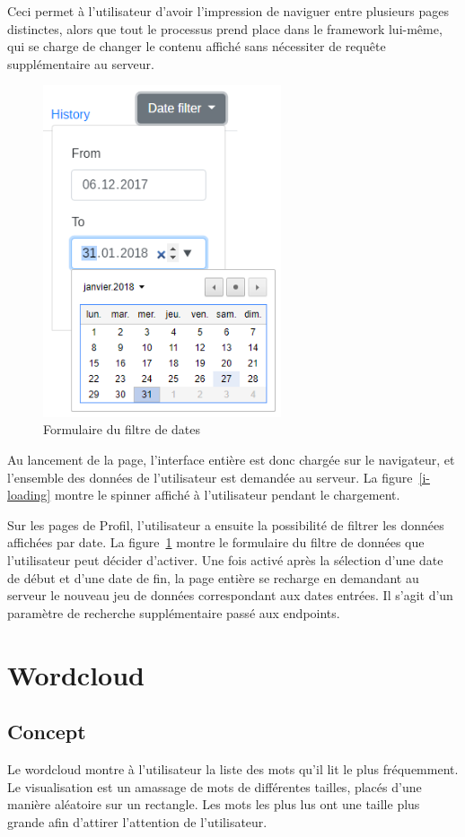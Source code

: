		Ceci permet à l'utilisateur d'avoir l'impression de naviguer entre plusieurs pages distinctes, alors que tout le processus prend place dans le framework lui-même, qui se charge de changer le contenu affiché sans nécessiter de requête supplémentaire au serveur.

		\begin{figure}[!h]
			\centering
			\includegraphics[width=7cm]{images/design/date_filter}
			\caption{Formulaire du filtre de dates}\label{i-filter}
		\end{figure}

		Au lancement de la page, l'interface entière est donc chargée sur le navigateur, et l'ensemble des données de l'utilisateur est demandée au serveur. La figure~\ref{i-loading} montre le spinner affiché à l'utilisateur pendant le chargement.

		Sur les pages de Profil, l'utilisateur a ensuite la possibilité de filtrer les données affichées par date. La figure~\ref{i-filter} montre le formulaire du filtre de données que l'utilisateur peut décider d'activer. Une fois activé après la sélection d'une date de début et d'une date de fin, la page entière se recharge en demandant au serveur le nouveau jeu de données correspondant aux dates entrées. Il s'agit d'un paramètre de recherche supplémentaire passé aux endpoints.

%
%
%
%

\section{Wordcloud}

	\subsection{Concept}
		Le wordcloud montre à l'utilisateur la liste des mots qu'il lit le plus fréquemment. Le visualisation est un amassage de mots de différentes tailles, placés d'une manière aléatoire sur un rectangle. Les mots les plus lus ont une taille plus grande afin d'attirer l'attention de l'utilisateur.

